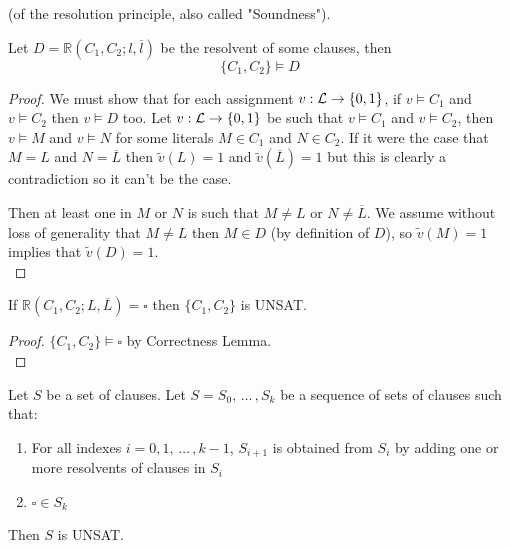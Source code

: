 
\vspace{-0.25cm}

\begin{lemma}[Correctness] \label{lem:correct}
(of the resolution principle, also called "Soundness").

\noindent
Let $D = \mathbb{R}(C_1, C_2; l, \overline l)$ be the resolvent of some clauses, then
	$$\{C_1, C_2\} \models D$$
\end{lemma}

\begin{proof}
	We must show that for each assignment $v: \mathcal{L} \rightarrow \{0,1\}$, if $v \models C_1$ and $v \models C_2$ then $v \models D$ too. Let $v: \mathcal{L} \rightarrow \{0,1\}$ be such that $v \models C_1$ and $v \models C_2$, then $v \models M$ and $v \models N$ for some literals $M \in C_1$ and $N \in C_2$. If it were the case that $M=L$ and $N = \overline L$ then $\tilde v (L) = 1$ and $\tilde v(\overline L) = 1$ but this is clearly a contradiction so it can't be the case.

	Then at least one in $M$ or $N$ is such that $M \neq L$ or $N \neq \overline L$. We assume without loss of generality that $M \neq L$ then $M \in D$ (by definition of $D$), so $\tilde v (M) = 1$ implies that $\tilde v (D) = 1$.\\
\end{proof}

\begin{corollary}
	If $\mathbb{R} (C_1, C_2; L, \overline L) = \square$ then $\{C_1, C_2\}$ is UNSAT.
\end{corollary}

\begin{proof}
	$\{C_1, C_2\} \models \square$ by Correctness Lemma. \\
\end{proof}

\begin{corollary}
	Let $S$ be a set of clauses. Let $S = S_0, \, \dots \, , S_k$ be a sequence of sets of clauses such that:
	\begin{enumerate}
		\item For all indexes $i = 0, 1, \, \dots \, , k-1$, $S_{i+1}$ is obtained from $S_i$ by adding one or more resolvents of clauses in $S_i$
		\item $\square \in S_k$
	\end{enumerate}

	Then $S$ is UNSAT.
\end{corollary}

